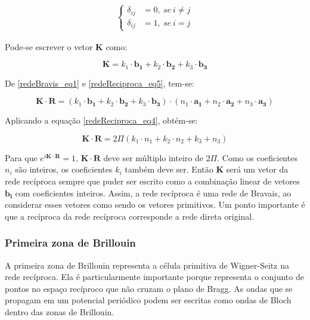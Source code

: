       \begin{align}\label{delta_kronecker_sistema}
        \left\{
          \begin{array}{ll}
            \displaystyle \delta_{ij} &= 0,\ se \ i\neq j\\
            \displaystyle \delta_{ij} &= 1,\ se \ i = j
          \end{array}
        \right.
      \end{align}

      \par Pode-se escrever o vetor \textbf{K} como:

      \begin{equation}\label{redeReciproca_eq5}
        \mathbf{K} = k_{1}\cdot \mathbf{b_{1}} + k_{2}\cdot \mathbf{b_{2}} + k_{3}\cdot \mathbf{b_{3}}
      \end{equation}

      \par De \eqref{redeBravis_eq1} e \eqref{redeReciproca_eq5}, tem-se:

      \begin{equation}\label{redeReciproca_eq6}
        \mathbf{K} \cdot \mathbf{R} = (k_{1} \cdot \mathbf{b_{1}} + k_{2} \cdot \mathbf{b_{2}} + k_{3} \cdot \mathbf{b_{3}})\cdot(n_{1} \cdot \mathbf{a_{1}} + n_{2} \cdot \mathbf{a_{2}} + n_{3} \cdot \mathbf{a_{3}})
      \end{equation}

      \par Aplicando a equação \eqref{redeReciproca_eq4}, obtém-se:

      \begin{equation}\label{redeReciproca_eq6}
        \mathbf{K} \cdot \mathbf{R} = 2 \Pi (k_{1} \cdot n_{1} + k_{2} \cdot n_{2} + k_{3} + n_{3})
      \end{equation}

      \par Para que $e^{i\mathbf{K} \cdot \mathbf{R}} = 1$, $\mathbf{K} \cdot \mathbf{R}$ deve ser múltiplo inteiro de $2 \Pi$. Como os coeficientes $n_{i}$ são inteiros, os coeficientes $k_{i}$ também deve ser. Então \textbf{K} será um vetor da rede recíproca sempre que puder ser escrito como a combinação linear de vetores $\mathbf{b_{i}}$ com coeficientes inteiros. Assim, a rede recíproca é uma rede de Bravais, ao considerar esses vetores como sendo os vetores primitivos. Um ponto importante é que a recíproca da rede recíproca corresponde a rede direta original.\cite{qm_fis5}

    \subsubsection{Primeira zona de Brillouin}

      A primeira zona de Brillouin representa a célula primitiva de Wigner-Seitz na rede recíproca. Ela é particularmente importante porque representa o conjunto de pontos no espaço recíproco que não cruzam o plano de Bragg. As ondas que se propagam em um potencial periódico podem ser escritas como ondas de Bloch dentro das zonas de Brillouin.\cite{qm_fis6}